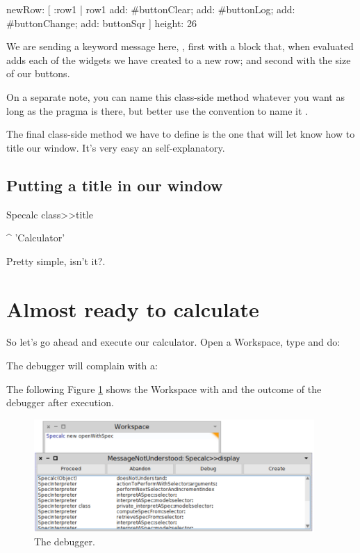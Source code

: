 \documentclass[a4paper,10pt,twoside]{book}
\begin{document}
\begin{code}{}
newRow: [ :row1 | row1	add: #buttonClear;
						add: #buttonLog;
						add: #buttonChange;
						add: buttonSqr ]
height: 26
\end{code}
 

We are sending a keyword message here, , first with a block that, when evaluated adds each of the widgets we have created to a new row; and second with the size of our buttons. 

On a separate note, you can name this class-side method whatever you want as long as the  pragma is there, but better use the convention to name it .

The final class-side method we have to define is the one that will let  know how to title our window. It's very easy an self-explanatory.
\subsection{Putting a title in our window}

\begin{code}{}
Specalc class>>title

	^ 'Calculator'
\end{code}


Pretty simple, isn't it?.
\section{ Almost ready to calculate}
So let's go ahead and execute our calculator. Open a Workspace, type and do: 

The debugger will complain with a: 

The following Figure \ref{messagewrong} shows the Workspace with  and the outcome of the debugger after execution. 

\begin{figure}

\begin{center}
\includegraphics[width=0.95\textwidth]{figures/messagewrong.png}\caption{The debugger.\label{messagewrong}}\end{center}
\end{figure}
\end{document}
